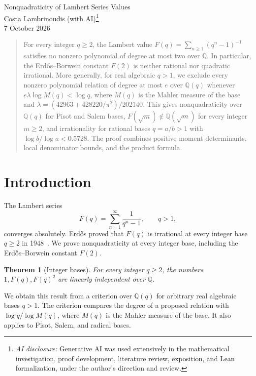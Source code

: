 \documentclass[12pt]{article}
\newtheorem{theorem}{Theorem}[section]
\theoremstyle{remark}
\newcommand{\Q}{\mathbb Q}
\begin{document}
\begin{center}
{\LARGE Nonquadraticity of Lambert Series Values}\\[1.5ex]
{\large Costa Lambrinoudis {\normalsize(with AI)}}\footnote{\textit{AI disclosure:} Generative AI was used extensively in the mathematical investigation, proof development, literature review, exposition, and Lean formalization, under the author's direction and review.}\\[0.5ex]
{7 October 2026}
\end{center}

\begin{quote}\small
For every integer $q\geq2$, the Lambert value
$F(q)=\sum_{n\geq1}(q^n-1)^{-1}$ satisfies no nonzero polynomial of degree at
most two over $\Q$. In particular, the Erd\H{o}s--Borwein constant $F(2)$ is
neither rational nor quadratic irrational. More generally, for real algebraic
$q>1$, we exclude every nonzero polynomial relation of degree at most $e$ over
$\Q(q)$ whenever $e\lambda\log M(q)<\log q$, where $M(q)$ is the Mahler measure
of the base and $\lambda=(42963+428220/\pi^2)/202140$.
This gives nonquadraticity over $\Q(q)$ for Pisot and Salem bases,
$F(\sqrt m)\notin\Q(\sqrt m)$ for every integer $m\geq2$, and irrationality
for rational bases $q=a/b>1$ with $\log b/\log a<0.5728$.
The proof combines positive moment determinants, local denominator bounds,
and the product formula.
\end{quote}

\section{Introduction}

The Lambert series
\[
F(q)=\sum_{n=1}^{\infty}\frac1{q^n-1},\qquad q>1,
\]
converges absolutely. Erd\H{o}s proved that $F(q)$ is irrational at every integer
base $q\geq2$ in 1948~\cite{erdos1948}. We prove nonquadraticity at every
integer base, including the Erd\H{o}s--Borwein constant $F(2)$.

\begin{theorem}[Integer bases]\label{thm:integer}
For every integer $q\geq2$, the numbers $1,F(q),F(q)^2$ are linearly
independent over $\Q$.
\end{theorem}

We obtain this result from a criterion over $\Q(q)$ for arbitrary real
algebraic bases $q>1$. The criterion compares the degree of a proposed relation
with $\log q/\log M(q)$, where $M(q)$ is the Mahler measure of the base.
It also applies to Pisot, Salem, and radical bases.
\end{document}
